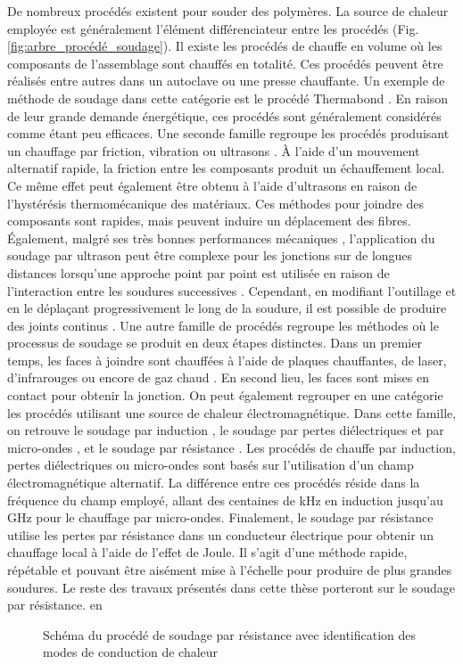 \FloatBarrier
De nombreux procédés existent pour souder des polymères. 
La source de chaleur employée est généralement l'élément différenciateur entre les procédés (Fig. \ref{fig:arbre_procédé_soudage}). 
Il existe les procédés de chauffe en volume où les composants de l'assemblage sont chauffés en totalité. 
Ces procédés peuvent être réalisés entre autres dans un autoclave ou une presse chauffante. 
Un exemple de méthode de soudage dans cette catégorie est le procédé Thermabond \cite{Smiley1991a}. 
En raison de leur grande demande énergétique, ces procédés sont généralement considérés comme étant peu efficaces. 
Une seconde famille regroupe les procédés produisant un chauffage par friction, vibration ou ultrasons \cite{Bates2007d}. 
À l'aide d'un mouvement alternatif rapide, la friction entre les composants produit un échauffement local. 
Ce même effet peut également être obtenu à l'aide d'ultrasons en raison de l'hystérésis thermomécanique des matériaux. 
Ces méthodes pour joindre des composants sont rapides, mais peuvent induire un déplacement des fibres. 
Également, malgré ses très bonnes performances mécaniques \cite{Villegas2016}, l'application du soudage par ultrason peut être complexe pour les jonctions sur de longues distances lorsqu'une approche point par point est utilisée en raison de l'interaction entre les soudures successives \cite{Zhao2018}. 
Cependant, en modifiant l'outillage et en le déplaçant progressivement le long de la soudure, il est possible de produire des joints continus \cite{Engelschall2019}.
Une autre famille de procédés regroupe les méthodes où le processus de soudage se produit en deux étapes distinctes. 
Dans un premier temps, les faces à joindre sont chauffées à l'aide de plaques chauffantes, de laser, d'infrarouges ou encore de gaz chaud \cite{Yousefpour2004a,Johnson1989}. 
En second lieu, les faces sont mises en contact pour obtenir la jonction. 
On peut également regrouper en une catégorie les procédés utilisant une source de chaleur électromagnétique. 
Dans cette famille, on retrouve le soudage par induction \cite{Rudolf2000a,Ahmed2006a,Farahani2018}, le soudage  par pertes diélectriques et par micro-ondes \cite{Wu2012,Bowler2006a,Menendez2010d}, et le soudage par résistance \cite{houghton1984bonding,Eveno1988,Taylor1991,McKnight1997}. 
Les procédés de chauffe par induction, pertes diélectriques ou micro-ondes sont basés sur l'utilisation d'un champ électromagnétique alternatif. 
La différence entre ces procédés réside dans la fréquence du champ employé, allant des centaines de \si{\kilo\hertz} en induction jusqu'au \si{\giga\hertz} pour le chauffage par micro-ondes. 
Finalement, le soudage par résistance utilise les pertes par résistance dans un conducteur électrique pour obtenir un chauffage local à l'aide de l'effet de Joule. 
Il s'agit d'une méthode rapide, répétable et pouvant être aisément mise à l'échelle pour produire de plus grandes soudures. 
Le reste des travaux présentés dans cette thèse porteront sur le soudage par résistance. 
en
\begin{figure}[h]
	\centering
	
	\caption{Schéma du procédé de soudage par résistance avec identification des modes de conduction de chaleur}
	\label{fig:schema_soudage_resistance}
\end{figure}

